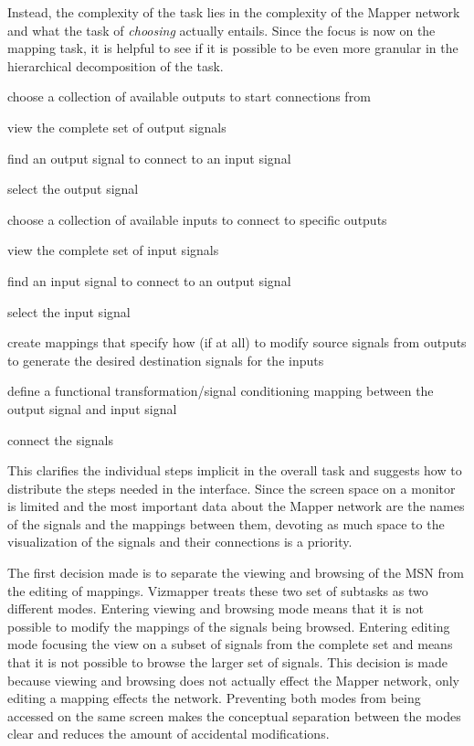 Instead, the complexity of the task lies in the complexity of the Mapper network and what the task of \emph{choosing} actually entails. Since the focus is now on the mapping task, it is helpful to see if it is possible to be even more granular in the hierarchical decomposition of the task. 

\begin{description}
	\item choose a collection of available outputs to start connections from
    \begin{description}
        \item view the complete set of output signals
        \item find an output signal to connect to an input signal
        \item select the output signal
    \end{description}
	\item choose a collection of available inputs to connect to specific outputs
    \begin{description}
        \item view the complete set of input signals
        \item find an input signal to connect to an output signal
        \item select the input signal
    \end{description}
	\item create mappings that specify how (if at all) to modify source signals from outputs to generate the desired destination signals for the inputs
    \begin{description}
        \item define a functional transformation/signal conditioning mapping between the output signal and input signal 
        \item connect the signals
    \end{description}
\end{description}

This clarifies the individual steps implicit in the overall task and suggests how to distribute the steps needed in the interface. Since the screen space on a monitor is limited and the most important data about the Mapper network are the names of the signals and the mappings between them, devoting as much space to the visualization of the signals and their connections is a priority.

The first decision made is to separate the viewing and browsing of the MSN from the editing of mappings. Vizmapper treats these two set of subtasks as two different modes. Entering viewing and browsing mode means that it is not possible to modify the mappings of the signals being browsed. Entering editing mode focusing the view on a subset of signals from the complete set and means that it is not possible to browse the larger set of signals. This decision is made because viewing and browsing does not actually effect the Mapper network, only editing a mapping effects the network. Preventing both modes from being accessed on the same screen makes the conceptual separation between the modes clear and reduces the amount of accidental modifications.

